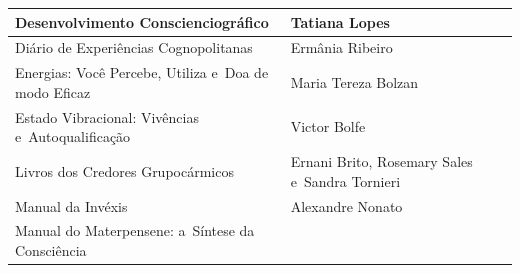 \documentclass{gescons}
\begin{document}
\begin{longtable}[]{@{}
  >{\raggedright\arraybackslash}p{}
  >{\raggedright\arraybackslash}p{}@{}}
\hline
\begin{minipage}[t]{\linewidth}\raggedright
Desenvolvimento Conscienciográfico
\end{minipage} & \begin{minipage}[t]{\linewidth}\raggedright
Tatiana Lopes
\end{minipage} \\
\hline
\begin{minipage}[t]{\linewidth}\raggedright
Diário de Experiências Cognopolitanas
\end{minipage} & \begin{minipage}[t]{\linewidth}\raggedright
Ermânia Ribeiro
\end{minipage} \\
\hline
\begin{minipage}[t]{\linewidth}\raggedright
Energias: Você Percebe, Utiliza e~Doa de modo Eficaz
\end{minipage} & \begin{minipage}[t]{\linewidth}\raggedright
Maria Tereza Bolzan
\end{minipage} \\
\hline
\begin{minipage}[t]{\linewidth}\raggedright
Estado Vibracional: Vivências e~Autoqualificação
\end{minipage} & \begin{minipage}[t]{\linewidth}\raggedright
Victor Bolfe
\end{minipage} \\
\hline
\begin{minipage}[t]{\linewidth}\raggedright
Livros dos Credores Grupocármicos
\end{minipage} & \begin{minipage}[t]{\linewidth}\raggedright
Ernani Brito, Rosemary Sales e~Sandra Tornieri
\end{minipage} \\
\hline
\begin{minipage}[t]{\linewidth}\raggedright
Manual da Invéxis
\end{minipage} & \begin{minipage}[t]{\linewidth}\raggedright
Alexandre Nonato
\end{minipage} \\
\hline
\begin{minipage}[t]{\linewidth}\raggedright
Manual do Materpensene: a~Síntese da Consciência
\end{minipage} & \begin{minipage}[t]{\linewidth}\raggedright

\end{minipage}
\end{longtable}
\end{document}
